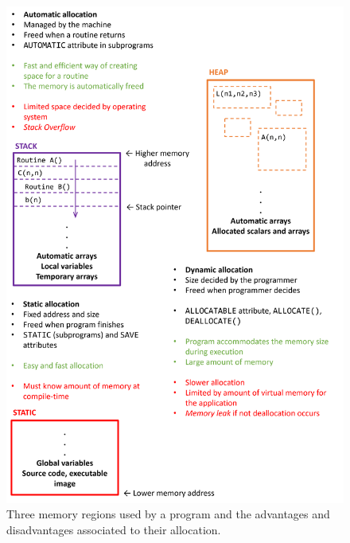 \begin{figure}[h]
    \centering
    \includegraphics[width= \textwidth]{./doc/Figures/Memories.png}
    \caption{Three memory regions used by a program and the advantages and disadvantages associated to their allocation.}
    \label{fig:Memories}
\end{figure}









